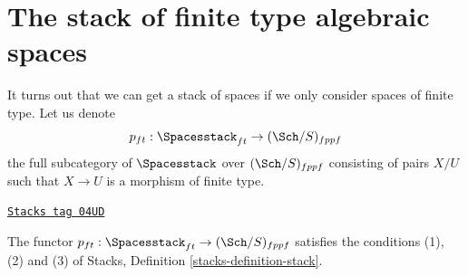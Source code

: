 \section{The stack of finite type algebraic spaces}
\label{examples-stacks-section-stack-of-finite-type-spaces}
It turns out that we can get a stack of spaces
if we only consider spaces of finite type.
Let us denote
$$
p_{ft} : \Spacesstack_{ft} \to (\Sch/S)_{fppf}
$$
the full subcategory of $\Spacesstack$ over $(\Sch/S)_{fppf}$
consisting of pairs $X/U$ such that $X \to U$
is a morphism of finite type.

\begin{lemma}
\label{examples-stacks-lemma-stack-of-finite-type-spaces}
\href{https://stacks.math.columbia.edu/tag/04UD}{\texttt{Stacks tag 04UD}}

The functor
$p_{ft} : \Spacesstack_{ft} \to (\Sch/S)_{fppf}$
satisfies the conditions (1), (2) and (3) of
Stacks, Definition \ref{stacks-definition-stack}.
\end{lemma}

